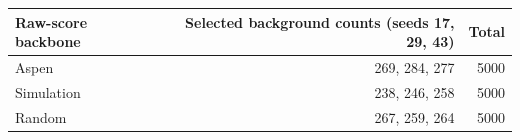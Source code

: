 \begin{tabular}{lrr}
\toprule
Raw-score backbone & Selected background counts (seeds 17, 29, 43) & Total \\
\midrule
Aspen & 269, 284, 277 & 5000 \\
Simulation & 238, 246, 258 & 5000 \\
Random & 267, 259, 264 & 5000 \\
\bottomrule
\end{tabular}
